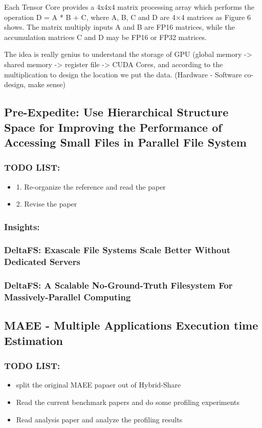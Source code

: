 \documentclass[UTF8]{article}
\begin{document}
    Each Tensor Core provides a 4x4x4 matrix processing array which performs the operation D = A * B + C, where A, B, C and D are 4×4 matrices as Figure 6 shows. The matrix multiply inputs A and B are FP16 matrices, while the accumulation matrices C and D may be FP16 or FP32 matrices.

    The idea is really genius to understand the storage of GPU (global memory -> shared memory -> register file -> CUDA Cores, and according to the multiplication to design the location we put the data. (Hardware - Software co-design, make sense)

    


\subsection{Pre-Expedite: Use Hierarchical Structure Space for Improving the Performance of Accessing Small Files in Parallel File System}
    \subsubsection{TODO LIST:}
    \begin{itemize}
        \item 1. Re-organize the reference and read the paper
        \item 2. Revise the paper
    \end{itemize}
    \subsubsection{Insights:}
    \subsubsection{DeltaFS: Exascale File Systems Scale Better Without Dedicated Servers}
    \subsubsection{DeltaFS: A Scalable No-Ground-Truth Filesystem For Massively-Parallel Computing}

\subsection{MAEE - Multiple Applications Execution time Estimation}
    \subsubsection{TODO LIST:}
    \begin{itemize}
        \item split the original MAEE papaer out of Hybrid-Share
        \item Read the current benchmark papers and do some profiling experiments
        \item Read analysis paper and analyze the profiling results
    \end{itemize}
\end{document}
